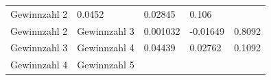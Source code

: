 \documentclass[ngerman,]{article}
\begin{document}
\begin{longtable}[]{@{}lllll@{}}
\begin{minipage}[t]{0.19\columnwidth}
Gewinnzahl 2\strut
\end{minipage} & \begin{minipage}[t]{0.19\columnwidth}\raggedright\strut
0.0452\strut
\end{minipage} & \begin{minipage}[t]{0.19\columnwidth}\raggedright\strut
0.02845\strut
\end{minipage} & \begin{minipage}[t]{0.07\columnwidth}\raggedright\strut
0.106\strut
\end{minipage}\tabularnewline
\begin{minipage}[t]{0.23\columnwidth}\raggedright\strut
Gewinnzahl 2\strut
\end{minipage} & \begin{minipage}[t]{0.19\columnwidth}\raggedright\strut
Gewinnzahl 3\strut
\end{minipage} & \begin{minipage}[t]{0.19\columnwidth}\raggedright\strut
0.001032\strut
\end{minipage} & \begin{minipage}[t]{0.19\columnwidth}\raggedright\strut
-0.01649\strut
\end{minipage} & \begin{minipage}[t]{0.07\columnwidth}\raggedright\strut
0.8092\strut
\end{minipage}\tabularnewline
\begin{minipage}[t]{0.23\columnwidth}\raggedright\strut
Gewinnzahl 3\strut
\end{minipage} & \begin{minipage}[t]{0.19\columnwidth}\raggedright\strut
Gewinnzahl 4\strut
\end{minipage} & \begin{minipage}[t]{0.19\columnwidth}\raggedright\strut
0.04439\strut
\end{minipage} & \begin{minipage}[t]{0.19\columnwidth}\raggedright\strut
0.02762\strut
\end{minipage} & \begin{minipage}[t]{0.07\columnwidth}\raggedright\strut
0.1092\strut
\end{minipage}\tabularnewline
\begin{minipage}[t]{0.23\columnwidth}\raggedright\strut
Gewinnzahl 4\strut
\end{minipage} & \begin{minipage}[t]{0.19\columnwidth}\raggedright\strut
Gewinnzahl 5\strut
\end{minipage} & \begin{minipage}[t]{0.19\columnwidth}\raggedright\strut

\end{minipage}
\end{longtable}
\end{document}
